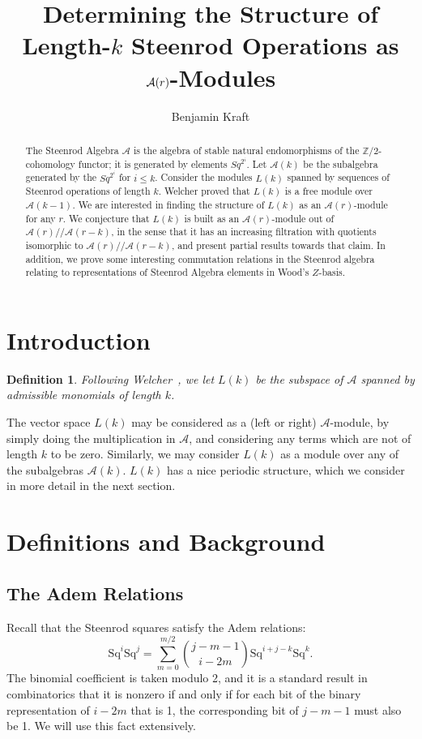 \documentclass{article}
\title{Determining the Structure of Length-$k$ Steenrod Operations as $\A(r)$-Modules}
\author{Benjamin Kraft}
\newcommand{\A}{\mathcal{A}}
\newcommand{\Sq}{\mathrm{Sq}}
\newcommand{\mmod}{/\!/\!}
\newtheorem{defn}{Definition}
\begin{document}
\begin{abstract}
  The Steenrod Algebra $\A$ is the algebra of stable natural endomorphisms of the $\mathbb{Z}/2$-cohomology functor; it is generated by elements $Sq^{2^i}$.  Let $\A(k)$ be the subalgebra generated by the $Sq^{2^i}$ for $i\leq k$.  Consider the modules $L(k)$ spanned by sequences of Steenrod operations of length $k$.  Welcher proved that $L(k)$ is a free module over $\A(k-1)$.  We are interested in finding the structure of $L(k)$ as an $\A(r)$-module for any $r$.  We conjecture that $L(k)$ is built as an $\A(r)$-module out of $\A(r)\mmod\A(r-k)$, in the sense that it has an increasing filtration with quotients isomorphic to $\A(r)\mmod\A(r-k)$, and present partial results towards that claim.  In addition, we prove some interesting commutation relations in the Steenrod algebra relating to representations of Steenrod Algebra elements in Wood's $Z$-basis.
\end{abstract}

\section{Introduction}


\begin{defn}
  Following Welcher~\cite{TODO}, we let $L(k)$ be the subspace of $\A$ spanned by admissible monomials of length $k$.
\end{defn}

The vector space $L(k)$ may be considered as a (left or right) $\A$-module, by simply doing the multiplication in $\A$, and considering any terms which are not of length $k$ to be zero.  Similarly, we may consider $L(k)$ as a module over any of the subalgebras $\A(k)$.  $L(k)$ has a nice periodic structure, which we consider in more detail in the next section.



\section{Definitions and Background}

\subsection{The Adem Relations}

Recall that the Steenrod squares satisfy the Adem relations:
\[ \Sq^i\Sq^j = \sum_{m=0}^{m/2}\binom{j-m-1}{i-2m}\Sq^{i+j-k}\Sq^k .\]
The binomial coefficient is taken modulo 2, and it is a standard result in combinatorics that it is nonzero if and only if for each bit of the binary representation of $i-2m$ that is 1, the corresponding bit of $j-m-1$ must also be 1.  We will use this fact extensively.
\end{document}
